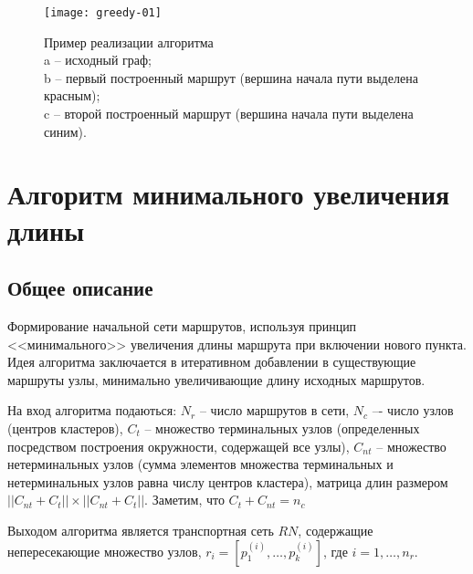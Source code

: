 \begin{figure}[h!]
    \centering
    \texttt{[image: greedy-01]}
    \caption{Пример реализации алгоритма\\
        a -- исходный граф;\\
        b -- первый построенный маршрут (вершина начала пути выделена красным);\\
        c -- второй построенный маршрут (вершина начала пути выделена синим).
    }
   \label{img:greedy-01}
\end{figure}


\section{Алгоритм минимального увеличения длины}
\subsection{Общее описание}

Формирование начальной сети маршрутов, используя принцип <<минимального>> увеличения длины маршрута при 
включении нового пункта. Идея алгоритма заключается в итеративном добавлении в существующие маршруты узлы, 
минимально увеличивающие длину исходных маршрутов. 

На вход алгоритма подаються: \( N_r \) -- число маршрутов в сети, \( N_c \) –- число узлов 
(центров кластеров), \( C_t \) – множество терминальных узлов (определенных посредством построения 
окружности, содержащей все узлы), \( C_{nt} \) – множество нетерминальных узлов (сумма элементов множества 
терминальных и нетерминальных узлов равна числу центров кластера), матрица длин размером 
\( ||{C_{nt}} + {C_{t}}|| \times ||{C_{nt}} + {C_{t}}|| \). Заметим, что \( C_t + C_{nt} = n_c \)

Выходом алгоритма является транспортная сеть \( RN \), содержащие непересекающие множество узлов, 
\( r_{i} = [p_{1}^{(i)}, \dots, p_{k}^{(i)}] \), где \( i = 1, \dots, n_r \). 

